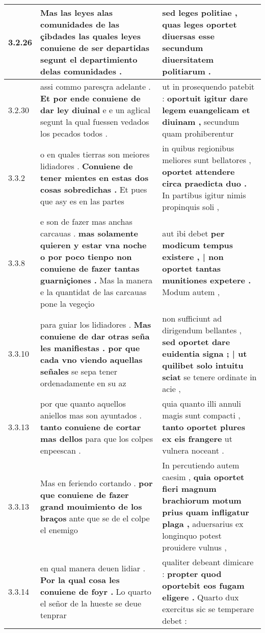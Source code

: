 \begin{tabular}{|p{1cm}|p{6.5cm}|p{6.5cm}|}
3.2.26 & Mas las leyes alas comunidades \textbf{ de las çibdades las quales leyes conuiene de ser departidas } segunt el departimiento delas comunidades . & sed leges politiae , \textbf{ quas leges oportet diuersas esse } secundum diuersitatem politiarum . \\\hline
3.2.30 & assi commo paresçra adelante . \textbf{ Et por ende conuiene de dar ley diuinal } e e un agłical segunt la qual fuessen vedados los pecados todos . & ut in prosequendo patebit : \textbf{ oportuit igitur dare legem euangelicam et diuinam , } secundum quam prohiberentur \\\hline
3.3.2 & o en quales tierras son meiores lidiadores . \textbf{ Conuiene de tener mientes en estas dos cosas sobredichas . } Et pues que asy es en las partes & in quibus regionibus meliores sunt bellatores , \textbf{ oportet attendere circa praedicta duo . } In partibus igitur nimis propinquis soli , \\\hline
3.3.8 & e son de fazer mas anchas carcauas . \textbf{ mas solamente quieren y estar vna noche o por poco tienpo non conuiene de fazer tantas guarniçiones . } Mas la manera e la quantidat de las carcauas pone la vegeçio & aut ibi debet \textbf{ per modicum tempus existere , | non oportet tantas munitiones expetere . } Modum autem , \\\hline
3.3.10 & para guiar los lidiadores . \textbf{ Mas conuiene de dar otras seña les manifiestas . por que cada vno viendo aquellas señales } se sepa tener ordenadamente en su az & non sufficiunt ad dirigendum bellantes , \textbf{ sed oportet dare euidentia signa ; | ut quilibet solo intuitu sciat } se tenere ordinate in acie , \\\hline
3.3.13 & por que quanto aquellos aniellos mas son ayuntados . \textbf{ tanto conuiene de cortar mas dellos } para que los colpes enpeescan . & quia quanto illi annuli magis sunt compacti , \textbf{ tanto oportet plures ex eis frangere } ut vulnera noceant . \\\hline
3.3.13 & Mas en feriendo cortando . \textbf{ por que conuiene de fazer grand mouimiento de los braços } ante que se de el colpe el enemigo & In percutiendo autem caesim , \textbf{ quia oportet fieri magnum brachiorum motum prius quam infligatur plaga , } aduersarius ex longinquo potest prouidere vulnus , \\\hline
3.3.14 & en qual manera deuen lidiar . \textbf{ Por la qual cosa les conuiene de foyr . } Lo quarto el señor de la hueste se deue tenprar & qualiter debeant dimicare : \textbf{ propter quod oportebit eos fugam eligere . } Quarto dux exercitus sic se temperare debet : \\\hline

\end{tabular}
